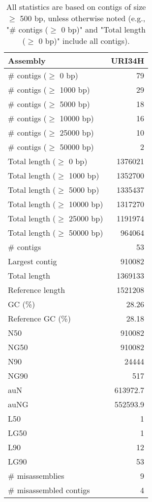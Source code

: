 \documentclass[12pt,a4paper]{article}
\begin{document}
\begin{table}[ht]
\begin{center}
\caption{All statistics are based on contigs of size $\geq$ 500 bp, unless otherwise noted (e.g., "\# contigs ($\geq$ 0 bp)" and "Total length ($\geq$ 0 bp)" include all contigs).}
\begin{tabular}{|l*{1}{|r}|}
\hline
Assembly & URI34H \\ \hline
\# contigs ($\geq$ 0 bp) & 79 \\ \hline
\# contigs ($\geq$ 1000 bp) & 29 \\ \hline
\# contigs ($\geq$ 5000 bp) & 18 \\ \hline
\# contigs ($\geq$ 10000 bp) & 16 \\ \hline
\# contigs ($\geq$ 25000 bp) & 10 \\ \hline
\# contigs ($\geq$ 50000 bp) & 2 \\ \hline
Total length ($\geq$ 0 bp) & 1376021 \\ \hline
Total length ($\geq$ 1000 bp) & 1352700 \\ \hline
Total length ($\geq$ 5000 bp) & 1335437 \\ \hline
Total length ($\geq$ 10000 bp) & 1317270 \\ \hline
Total length ($\geq$ 25000 bp) & 1191974 \\ \hline
Total length ($\geq$ 50000 bp) & 964064 \\ \hline
\# contigs & 53 \\ \hline
Largest contig & 910082 \\ \hline
Total length & 1369133 \\ \hline
Reference length & 1521208 \\ \hline
GC (\%) & 28.26 \\ \hline
Reference GC (\%) & 28.18 \\ \hline
N50 & 910082 \\ \hline
NG50 & 910082 \\ \hline
N90 & 24444 \\ \hline
NG90 & 517 \\ \hline
auN & 613972.7 \\ \hline
auNG & 552593.9 \\ \hline
L50 & 1 \\ \hline
LG50 & 1 \\ \hline
L90 & 12 \\ \hline
LG90 & 53 \\ \hline
\# misassemblies & 9 \\ \hline
\# misassembled contigs & 4 \\ \hline

\end{tabular}
\end{center}
\end{table}
\end{document}
